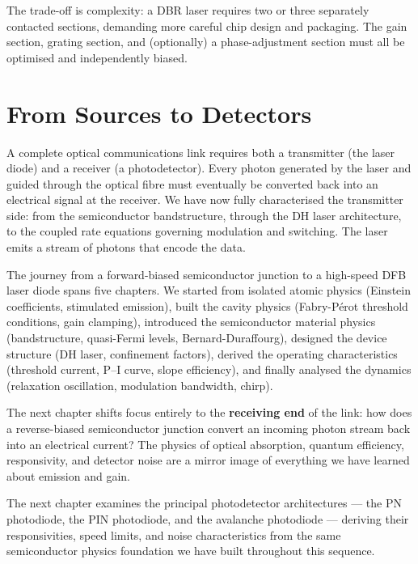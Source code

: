 The trade-off is complexity: a DBR laser requires two or three separately contacted sections, demanding more careful chip design and packaging. The gain section, grating section, and (optionally) a phase-adjustment section must all be optimised and independently biased.

\section{From Sources to Detectors}

A complete optical communications link requires both a transmitter (the laser diode) and a receiver (a photodetector). Every photon generated by the laser and guided through the optical fibre must eventually be converted back into an electrical signal at the receiver. We have now fully characterised the transmitter side: from the semiconductor bandstructure, through the DH laser architecture, to the coupled rate equations governing modulation and switching. The laser emits a stream of photons that encode the data.

\begin{keyinsight}
    The journey from a forward-biased semiconductor junction to a high-speed DFB laser diode spans five chapters. We started from isolated atomic physics (Einstein coefficients, stimulated emission), built the cavity physics (Fabry-Pérot threshold conditions, gain clamping), introduced the semiconductor material physics (bandstructure, quasi-Fermi levels, Bernard-Duraffourg), designed the device structure (DH laser, confinement factors), derived the operating characteristics (threshold current, P--I curve, slope efficiency), and finally analysed the dynamics (relaxation oscillation, modulation bandwidth, chirp).

    The next chapter shifts focus entirely to the \textbf{receiving end} of the link: how does a reverse-biased semiconductor junction convert an incoming photon stream back into an electrical current? The physics of optical absorption, quantum efficiency, responsivity, and detector noise are a mirror image of everything we have learned about emission and gain.
\end{keyinsight}

The next chapter examines the principal photodetector architectures — the PN photodiode, the PIN photodiode, and the avalanche photodiode — deriving their responsivities, speed limits, and noise characteristics from the same semiconductor physics foundation we have built throughout this sequence.
